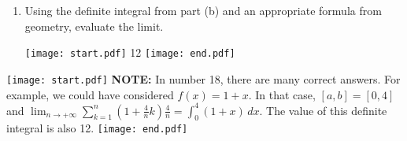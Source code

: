 \documentclass[12pt]{article}
\begin{document}
\begin{enumerate}
\begin{enumerate}
\item Using the definite integral from part (b) and an appropriate formula from geometry, evaluate the limit.

\texttt{[image: start.pdf]}
{{12}}
\texttt{[image: end.pdf]}


\end{enumerate}

\texttt{[image: start.pdf]}
{{\bf NOTE:} In number 18, there are many correct answers.  For example, we could have considered $f(x)=1+x$.  In that case, $[a,b]=[0,4]$ and $\lim_{n \rightarrow +\infty} \sum_{k=1}^n{\left(1+\frac{4}{n}k\right)\frac{4}{n}}=\int_0^4{(1+x)} \,dx$.  The value of this definite integral is also 12.}
\texttt{[image: end.pdf]}


\end{enumerate}
\end{document}
